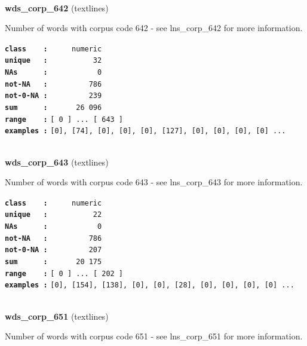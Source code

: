 \documentclass[]{article}
\begin{document}
~

\textbf{wds\_corp\_642} (textlines)

Number of words with corpus code 642 - see lns\_corp\_642 for more
information.

\textbf{\texttt{class\ \ \ \ :}} \texttt{~~~~~numeric}\\
\textbf{\texttt{unique\ \ \ :}} \texttt{~~~~~~~~~~32}\\
\textbf{\texttt{NAs\ \ \ \ \ \ :}} \texttt{~~~~~~~~~~~0}\\
\textbf{\texttt{not-NA\ \ \ :}} \texttt{~~~~~~~~~786}\\
\textbf{\texttt{not-0-NA\ :}} \texttt{~~~~~~~~~239}\\
\textbf{\texttt{sum\ \ \ \ \ \ :}} \texttt{~~~~~~26~096}\\
\textbf{\texttt{range\ \ \ \ :}}
\texttt{{[}\ 0\ {]}\ ...\ {[}\ 643\ {]}}\\
\textbf{\texttt{examples\ :}}
\texttt{{[}0{]},\ {[}74{]},\ {[}0{]},\ {[}0{]},\ {[}0{]},\ {[}127{]},\ {[}0{]},\ {[}0{]},\ {[}0{]},\ {[}0{]}\ ...}\\

~

\textbf{wds\_corp\_643} (textlines)

Number of words with corpus code 643 - see lns\_corp\_643 for more
information.

\textbf{\texttt{class\ \ \ \ :}} \texttt{~~~~~numeric}\\
\textbf{\texttt{unique\ \ \ :}} \texttt{~~~~~~~~~~22}\\
\textbf{\texttt{NAs\ \ \ \ \ \ :}} \texttt{~~~~~~~~~~~0}\\
\textbf{\texttt{not-NA\ \ \ :}} \texttt{~~~~~~~~~786}\\
\textbf{\texttt{not-0-NA\ :}} \texttt{~~~~~~~~~207}\\
\textbf{\texttt{sum\ \ \ \ \ \ :}} \texttt{~~~~~~20~175}\\
\textbf{\texttt{range\ \ \ \ :}}
\texttt{{[}\ 0\ {]}\ ...\ {[}\ 202\ {]}}\\
\textbf{\texttt{examples\ :}}
\texttt{{[}0{]},\ {[}154{]},\ {[}138{]},\ {[}0{]},\ {[}0{]},\ {[}28{]},\ {[}0{]},\ {[}0{]},\ {[}0{]},\ {[}0{]}\ ...}\\

~

\textbf{wds\_corp\_651} (textlines)

Number of words with corpus code 651 - see lns\_corp\_651 for more
information.
\end{document}

